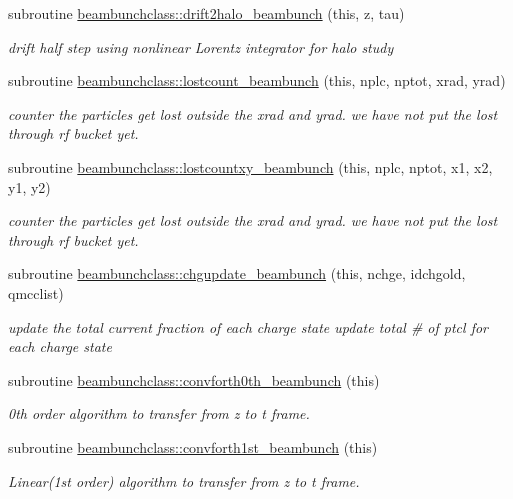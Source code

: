 \begin{DoxyCompactItemize}
subroutine \mbox{\hyperlink{namespacebeambunchclass_a3f5a86fb4b3ff5b33efdfa76b1c52ce4}{beambunchclass\+::drift2halo\+\_\+beambunch}} (this, z, tau)
\begin{DoxyCompactList}\small\item\em drift half step using nonlinear Lorentz integrator for halo study \end{DoxyCompactList}\item 
subroutine \mbox{\hyperlink{namespacebeambunchclass_a618f97b46c83d8ca29a7cb05345d655e}{beambunchclass\+::lostcount\+\_\+beambunch}} (this, nplc, nptot, xrad, yrad)
\begin{DoxyCompactList}\small\item\em counter the particles get lost outside the xrad and yrad. we have not put the lost through rf bucket yet. \end{DoxyCompactList}\item 
subroutine \mbox{\hyperlink{namespacebeambunchclass_a54a4d80405bb8fbde341ea9e46a224e4}{beambunchclass\+::lostcountxy\+\_\+beambunch}} (this, nplc, nptot, x1, x2, y1, y2)
\begin{DoxyCompactList}\small\item\em counter the particles get lost outside the xrad and yrad. we have not put the lost through rf bucket yet. \end{DoxyCompactList}\item 
subroutine \mbox{\hyperlink{namespacebeambunchclass_ac5b1c15c02703f7339b67283bc9816bd}{beambunchclass\+::chgupdate\+\_\+beambunch}} (this, nchge, idchgold, qmcclist)
\begin{DoxyCompactList}\small\item\em update the total current fraction of each charge state update total \# of ptcl for each charge state \end{DoxyCompactList}\item 
subroutine \mbox{\hyperlink{namespacebeambunchclass_a030c80c97cd3523478e56fdaff0e7560}{beambunchclass\+::convforth0th\+\_\+beambunch}} (this)
\begin{DoxyCompactList}\small\item\em 0th order algorithm to transfer from z to t frame. \end{DoxyCompactList}\item 
subroutine \mbox{\hyperlink{namespacebeambunchclass_a35f6511340579ba6bb5f07bebf6d09d5}{beambunchclass\+::convforth1st\+\_\+beambunch}} (this)
\begin{DoxyCompactList}\small\item\em Linear(1st order) algorithm to transfer from z to t frame. \end{DoxyCompactList}\item 

\end{DoxyCompactItemize}
